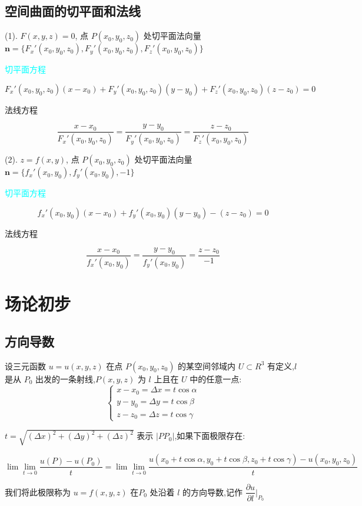 \subsection{空间曲面的切平面和法线}
\begin{definition}
	
	(1). $F(x,y,z)=0$, 点 $P(x_{0},y_{0},z_{0})$ 处切平面法向量 $\boldsymbol{n} = \{F_{x}'(x_{0},y_{0},z_{0}),F_{y}'(x_{0},y_{0},z_{0}),F_{z}'(x_{0},y_{0},z_{0})\}$
	
	\textcolor{cyan}{切平面方程}
	
	$$F_{x}'(x_{0},y_{0},z_{0})(x-x_{0}) + F_{y}'(x_{0},y_{0},z_{0})(y-y_{0}) + F_{z}'(x_{0},y_{0},z_{0})(z-z_{0}) = 0$$

	\textcolor{purplea}{法线方程}
	
	$$\dfrac{x-x_{0}}{F_{x}'(x_{0},y_{0},z_{0})} = \dfrac{y-y_{0}}{F_{y}'(x_{0},y_{0},z_{0})}=\dfrac{z-z_{0}}{F_{z}'(x_{0},y_{0},z_{0})}$$
	
	(2). $z=f(x,y)$, 点 $P(x_{0},y_{0},z_{0})$ 处切平面法向量 $\boldsymbol{n} = \{f_{x}'(x_{0},y_{0}),f_{y}'(x_{0},y_{0}),-1\}$
	
	
	\textcolor{cyan}{切平面方程}

	$$f_{x}'(x_{0},y_{0})(x-x_{0}) + f_{y}'(x_{0},y_{0})(y-y_{0}) - (z-z_{0}) = 0$$
	
	\textcolor{purplea}{法线方程}
	
	$$\dfrac{x-x_{0}}{f_{x}'(x_{0},y_{0})} = \dfrac{y-y_{0}}{f_{y}'(x_{0},y_{0})} = \dfrac{z-z_{0}}{-1}$$
\end{definition}

\section{场论初步}

\subsection{方向导数}
\begin{definition}[方向导数]
	
	设三元函数 $u=u(x,y,z)$ 在点 $P(x_{0},y_{0},z_{0})$ 的某空间邻域内 $U\subset R^3$ 有定义,$l$ 是从 $P_{0}$ 出发的一条射线,$P(x,y,z)$ 为 $l$ 上且在 $U$ 中的任意一点: 
	$$\begin{cases}
		x-x_{0}=\Delta x=t\cos \alpha\\
		y-y_{0}=\Delta y=t\cos \beta\\
		z-z_{0}=\Delta z=t\cos \gamma
	\end{cases}$$ 
	
	$t=\sqrt{(\Delta x)^2+(\Delta y)^2+(\Delta z)^2}$ 表示 $|PP_{0}|$,如果下面极限存在: 

	$$\lim\lim\limits_{t\to 0}\frac{u(P)-u(P_{0})}{t}=\lim\lim\limits_{t\to 0}\frac{u(x_{0}+t\cos \alpha,y_{0}+t\cos \beta,z_{0}+t\cos \gamma)-u(x_{0},y_{0},z_{0})}{t}$$
	
	我们将此极限称为 $u=f(x,y,z)$ 在$P_{0}$ 处沿着 $l$ 的方向导数,记作 $\dfrac{\partial u}{\partial l}|_{P_{0}}$
\end{definition}

